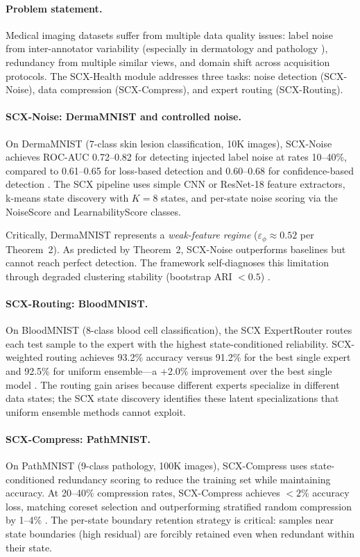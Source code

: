 \documentclass[twocolumn]{article}
\theoremstyle{definition}
\begin{document}
\paragraph{Problem statement.}
Medical imaging datasets suffer from multiple data quality issues: label noise from inter-annotator variability (especially in dermatology and pathology \cite{medmnist}), redundancy from multiple similar views, and domain shift across acquisition protocols. The SCX-Health module \cite{scxlife} addresses three tasks: noise detection (SCX-Noise), data compression (SCX-Compress), and expert routing (SCX-Routing).

\paragraph{SCX-Noise: DermaMNIST and controlled noise.}
On DermaMNIST (7-class skin lesion classification, 10K images), SCX-Noise achieves ROC-AUC 0.72--0.82 for detecting injected label noise at rates 10--40\%, compared to 0.61--0.65 for loss-based detection and 0.60--0.68 for confidence-based detection \cite{noise_module}. The SCX pipeline uses simple CNN or ResNet-18 feature extractors, k-means state discovery with $K=8$ states, and per-state noise scoring via the NoiseScore and LearnabilityScore classes.

Critically, DermaMNIST represents a \emph{weak-feature regime} ($\varepsilon_\phi \approx 0.52$ per Theorem~2). As predicted by Theorem~2, SCX-Noise outperforms baselines but cannot reach perfect detection. The framework self-diagnoses this limitation through degraded clustering stability (bootstrap ARI $< 0.5$) \cite{paperIII}.

\paragraph{SCX-Routing: BloodMNIST.}
On BloodMNIST (8-class blood cell classification), the SCX ExpertRouter routes each test sample to the expert with the highest state-conditioned reliability. SCX-weighted routing achieves 93.2\% accuracy versus 91.2\% for the best single expert and 92.5\% for uniform ensemble---a +2.0\% improvement over the best single model \cite{routing_module}. The routing gain arises because different experts specialize in different data states; the SCX state discovery identifies these latent specializations that uniform ensemble methods cannot exploit.

\paragraph{SCX-Compress: PathMNIST.}
On PathMNIST (9-class pathology, 100K images), SCX-Compress uses state-conditioned redundancy scoring to reduce the training set while maintaining accuracy. At 20--40\% compression rates, SCX-Compress achieves $<2\%$ accuracy loss, matching coreset selection and outperforming stratified random compression by 1--4\% \cite{compress_module}. The per-state boundary retention strategy is critical: samples near state boundaries (high residual) are forcibly retained even when redundant within their state.
\end{document}
